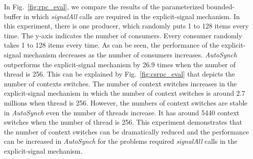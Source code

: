\documentclass{sigplanconf}
\begin{document}
In Fig.~\ref{fig:rpc_eval}, we compare the results of the parameterized 
bounded-buffer in which {\em signalAll} calls are required in the 
explicit-signal mechanism. In this experiment, there is one producer, which
randomly puts 1 to 128 items every time. The y-axis indicates the number of 
consumers. Every consumer randomly takes 1 to 128 items every time. As can be
seen, the performance of the explicit-signal mechanism decreases as the number
of consumers increases. {\em AutoSynch} outperforms the explicit-signal 
mechanism by 26.9 times when the number of thread is 256. This can be explained 
by Fig.~\ref{fig:csrpc_eval} that depicts the number of contexts switches. The
number of context switches increases in the explicit-signal
mechanism in which the number of context switches is around 2.7 millions when 
thread is 256. However, the numbers of context switches are stable in {\em
AutoSynch} even the number of threads increase. It has around 5440 context
switches when the number of thread is 256. This experiment demonstrates
that the number of context switches can be dramatically reduced and the
performance can be increased in {\em AutoSynch} for the problems required 
{\em signalAll} calls in the explicit-signal mechanism. 
\end{document}
